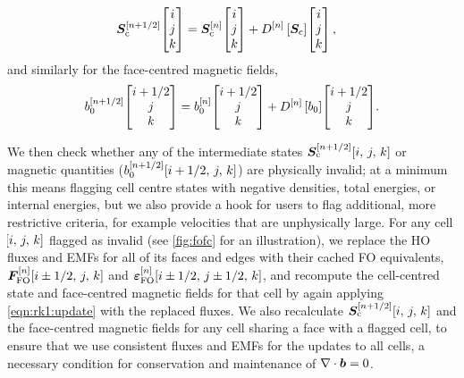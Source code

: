 \begin{align}
    \bm{S}_\mathrm{c}^{[n + 1/2]}\!\begin{bmatrix}i\\j\\k\end{bmatrix}
        &= \bm{S}_\mathrm{c}^{[n]}\!\begin{bmatrix}i\\j\\k\end{bmatrix}
            + D^{[n]}\left[ \bm{S}_\mathrm{c} \right]\!\begin{bmatrix}i\\j\\k\end{bmatrix}
    ,
\end{align}
and similarly for the face-centred magnetic fields,
\begin{align}
    \scalebox{0.975}{$\displaystyle
        b_0^{[n + 1/2]}\EvalAtV{i + 1/2}{j}{k}
            = b_0^{[n]}\EvalAtV{i + 1/2}{j}{k}
                + D^{[n]}\sbrac{b_0}\EvalAtV{i + 1/2}{j}{k}
    $}
    . \label{eqn:rk1:update}
\end{align}

We then check whether any of the intermediate states $\bm{S}_\mathrm{c}^{[n + 1/2]}\!\left[ i,\,j,\,k \right]$ or magnetic quantities (\eg $b_0^{[n + 1/2]}\!\left[ i + 1/2,\,j,\,k \right]$) are physically invalid; at a minimum this means flagging cell centre states with negative densities, total energies, or internal energies, but we also provide a hook for users to flag additional, more restrictive criteria, for example velocities that are unphysically large. For any cell $\!\left[ i,\,j,\,k \right]$ flagged as invalid (see \cref{fig:fofc} for an illustration), we replace the HO fluxes and EMFs for all of its faces and edges with their cached FO equivalents, $\bm{F}_\mathrm{FO}^{[n]}\!\left[ i \pm 1/2,\,j,\,k \right]$ and $\bm{\varepsilon}_\mathrm{FO}^{[n]}\!\left[ i \pm 1/2,\,j \pm 1/2,\,k \right]$, and recompute the cell-centred state and face-centred magnetic fields for that cell by again applying \cref{eqn:rk1:update} with the replaced fluxes. We also recalculate $\bm{S}_\mathrm{c}^{[n + 1/2]}\!\left[ i,\,j,\,k \right]$ and the face-centred magnetic fields for any cell sharing a face with a flagged cell, to ensure that we use consistent fluxes and EMFs for the updates to all cells, a necessary condition for conservation and maintenance of $\nabla\cdot\bm{b} = 0$.

